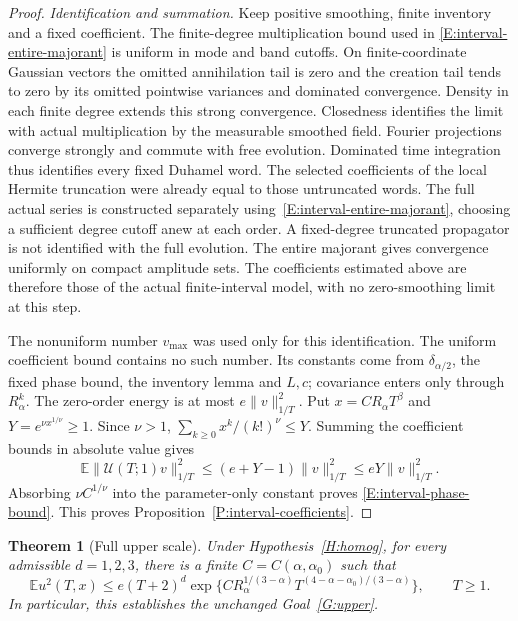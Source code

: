 \documentclass[12pt]{article}
\numberwithin{equation}{section}
\newtheorem{theorem}{Theorem}[section]
\theoremstyle{definition}
\newcommand{\E}{\mathbb{E}}
\begin{document}
\begin{proof}
  \emph{Identification and summation.}
  Keep positive smoothing, finite inventory and a fixed coefficient.
  The finite-degree multiplication bound used in
  \eqref{E:interval-entire-majorant} is uniform in mode and band cutoffs.
  On finite-coordinate Gaussian vectors the omitted annihilation tail is
  zero and the creation tail tends to zero by its omitted pointwise
  variances and dominated convergence. Density in each finite degree
  extends this strong convergence. Closedness identifies the limit with
  actual multiplication by the measurable smoothed field.
  Fourier projections converge strongly and commute with free evolution.
  Dominated time integration thus identifies every fixed Duhamel word.
  The selected coefficients of the local Hermite truncation were already
  equal to those untruncated words. The full actual series is constructed
  separately using~\eqref{E:interval-entire-majorant}, choosing a sufficient
  degree cutoff anew at each order. A fixed-degree truncated propagator
  is not identified with the full evolution.
  The entire majorant gives convergence uniformly on compact amplitude
  sets. The coefficients estimated above are therefore those of the
  actual finite-interval model, with no zero-smoothing limit at this step.

  The nonuniform number $v_{\max}$ was used only for this identification.
  The uniform coefficient bound contains no such number. Its constants
  come from $\delta_{\alpha/2}$, the fixed phase bound, the inventory
  lemma and $L,c$; covariance enters only through $R_\alpha^k$.
  The zero-order energy is at most $e\|v\|_{1/T}^2$.
  Put $x=CR_\alpha T^\beta$ and $Y=e^{\nu x^{1/\nu}}\ge1$.
  Since $\nu>1$, $\sum_{k\ge0}x^k/(k!)^\nu\le Y$.
  Summing the coefficient bounds in absolute value gives
  \[
    \E\|\mathcal U(T;1)v\|_{1/T}^2
    \le(e+Y-1)\|v\|_{1/T}^2\le eY\|v\|_{1/T}^2.
  \]
  Absorbing $\nu C^{1/\nu}$ into the parameter-only constant proves
  \eqref{E:interval-phase-bound}. This proves
  Proposition~\ref{P:interval-coefficients}.
\end{proof}

\begin{theorem}[Full upper scale]\label{T:full-upper}
  Under Hypothesis~\ref{H:homog}, for every admissible $d=1,2,3$,
  there is a finite $C=C(\alpha,\alpha_0)$ such that
  \begin{equation}\label{E:full-upper-bound}
    \E u^2(T,x)
    \le e(T+2)^d
    \exp\{C R_\alpha^{1/(3-\alpha)}
    T^{(4-\alpha-\alpha_0)/(3-\alpha)}\},\qquad T\ge1.
  \end{equation}
  In particular, this establishes the unchanged Goal~\ref{G:upper}.
\end{theorem}
\end{document}
